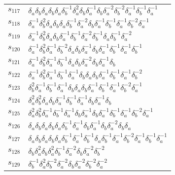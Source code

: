 \documentclass{article}
\begin{document}
\begin{center}
\begin{tabular}{ll}
$s_{117}$ & $\delta_a^{}\delta_b^{}\delta_a^{}\delta_b^{}\delta_a^{}\delta_b^{-1}\delta_a^{2}\delta_b^{}\delta_a^{-1}\delta_b^{}\delta_a^{-2}\delta_b^{-2}\delta_a^{-1}\delta_b^{-1}\delta_a^{-1}$ \\
$s_{118}$ & $\delta_a^{-1}\delta_b^{2}\delta_a^{}\delta_b^{}\delta_a^{}\delta_b^{-1}\delta_a^{-2}\delta_b^{}\delta_a^{-1}\delta_b^{-1}\delta_a^{-1}\delta_b^{-2}\delta_a^{-1}$ \\
$s_{119}$ & $\delta_a^{-1}\delta_b^{2}\delta_a^{}\delta_b^{}\delta_a^{-1}\delta_b^{-1}\delta_a^{-2}\delta_b^{-1}\delta_a^{}\delta_b^{-1}\delta_a^{-2}$ \\
$s_{120}$ & $\delta_a^{-1}\delta_b^{2}\delta_a^{-1}\delta_b^{-2}\delta_a^{}\delta_b^{}\delta_a^{-1}\delta_b^{}\delta_a^{-1}\delta_b^{-1}\delta_a^{-1}\delta_b^{-1}$ \\
$s_{121}$ & $\delta_a^{-1}\delta_b^{2}\delta_a^{-1}\delta_b^{-1}\delta_a^{}\delta_b^{}\delta_a^{-2}\delta_b^{}\delta_a^{-1}\delta_b^{}$ \\
$s_{122}$ & $\delta_a^{-1}\delta_b^{2}\delta_a^{-1}\delta_b^{-1}\delta_a^{-1}\delta_b^{}\delta_a^{}\delta_b^{}\delta_a^{-1}\delta_b^{-1}\delta_a^{-1}\delta_b^{-2}$ \\
$s_{123}$ & $\delta_b^{2}\delta_a^{-1}\delta_b^{-1}\delta_a^{-1}\delta_b^{}\delta_a^{}\delta_b^{}\delta_a^{-1}\delta_b^{-1}\delta_a^{-1}\delta_b^{-2}\delta_a^{-1}$ \\
$s_{124}$ & $\delta_a^{2}\delta_b^{2}\delta_a^{}\delta_b^{}\delta_a^{-1}\delta_b^{-1}\delta_a^{-1}\delta_b^{}\delta_a^{-1}\delta_b^{}$ \\
$s_{125}$ & $\delta_a^{2}\delta_b^{2}\delta_a^{-1}\delta_b^{-1}\delta_a^{-1}\delta_b^{}\delta_a^{-1}\delta_b^{}\delta_a^{-1}\delta_b^{-1}\delta_a^{-1}\delta_b^{-2}\delta_a^{-1}$ \\
$s_{126}$ & $\delta_a^{}\delta_b^{}\delta_a^{}\delta_b^{}\delta_a^{}\delta_b^{-1}\delta_a^{-1}\delta_b^{}\delta_a^{-1}\delta_b^{}\delta_a^{-2}\delta_b^{}\delta_a^{}$ \\
$s_{127}$ & $\delta_a^{}\delta_b^{}\delta_a^{}\delta_b^{}\delta_a^{}\delta_b^{-1}\delta_a^{-1}\delta_b^{-1}\delta_a^{}\delta_b^{-1}\delta_a^{-1}\delta_b^{-2}\delta_a^{-1}\delta_b^{-1}\delta_a^{-1}$ \\
$s_{128}$ & $\delta_b^{}\delta_a^{2}\delta_b^{}\delta_a^{2}\delta_b^{-1}\delta_a^{-2}\delta_b^{}\delta_a^{-2}\delta_b^{-2}$ \\
$s_{129}$ & $\delta_b^{-1}\delta_a^{2}\delta_b^{-2}\delta_a^{-2}\delta_b^{}\delta_a^{-2}\delta_b^{-2}\delta_a^{-2}$ \\

\end{tabular}
\end{center}
\end{document}
